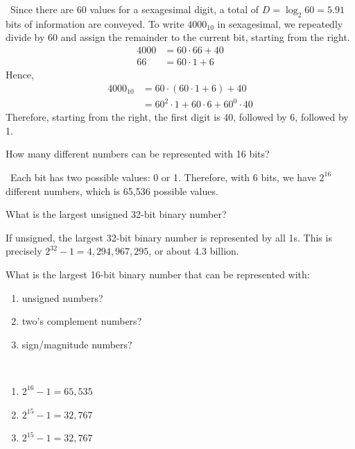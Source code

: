 \documentclass[12pt]{article}
\newenvironment{ex}[2][Exercise]{\begin{trivlist}
		\item[\hskip \labelsep {\bfseries #1}\hskip \labelsep {\bfseries #2.}]}{\end{trivlist}}
\newenvironment{sol}[1][Solution]{\begin{trivlist}
		\item[\hskip \labelsep {\bfseries #1:}]}{\end{trivlist}}
\begin{document}
\begin{sol}\
	Since there are 60 values for a sexagesimal digit, a total of $D=\log_2{60}=5.91$ bits of information are conveyed. To write $4000_{10}$ in sexagesimal, we repeatedly divide by 60 and assign the remainder to the current bit, starting from the right.
	\begin{align}
		4000 &= 60\cdot 66+40\nonumber\\
		66&=60\cdot 1 + 6\nonumber
	\end{align}
	Hence,
	\begin{align}
		4000_{10}&=60\cdot (60\cdot 1+6)+40\nonumber\\
		&=60^2\cdot 1+60\cdot 6+60^{0}\cdot 40
	\end{align}
	Therefore, starting from the right, the first digit is 40, followed by 6, followed by 1.
\end{sol}

\begin{ex}{1.7}
	How many different numbers can be represented with 16 bits?
\end{ex}

\begin{sol}\
	Each bit has two possible values: 0 or 1. Therefore, with 6 bits, we have $2^{16}$ different numbers, which is 65,536 possible values.
\end{sol}

\begin{ex}{1.8}
	What is the largest unsigned 32-bit binary number?
\end{ex}

\begin{sol}
	If unsigned, the largest 32-bit binary number is represented by all 1s. This is precisely $2^{32}-1=4,294,967,295$, or about 4.3 billion.
\end{sol}

\begin{ex}{1.9}
	What is the largest 16-bit binary number that can be represented with:
	\begin{enumerate}[label=(\alph*)]
		\item unsigned numbers?
		\item two's complement numbers?
		\item sign/magnitude numbers?
	\end{enumerate}
\end{ex}

\begin{sol}\
	\begin{enumerate}[label=(\alph*)]
		\item $2^{16}-1=65,535$
		\item $2^{15}-1=32,767$
		\item $2^{15}-1=32,767$
	\end{enumerate}
\end{sol}
\end{document}
